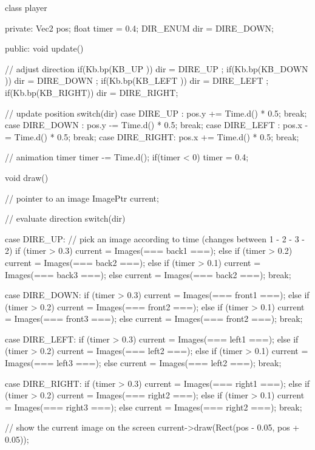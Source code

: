 \begin{code}
class player
{
private: 
   Vec2 pos;
   float timer = 0.4; 
   DIR_ENUM dir = DIRE_DOWN;
   
public:    
   void update()
   {
      // adjust direction
      if(Kb.bp(KB_UP   )) dir = DIRE_UP   ;
      if(Kb.bp(KB_DOWN )) dir = DIRE_DOWN ;
      if(Kb.bp(KB_LEFT )) dir = DIRE_LEFT ;
      if(Kb.bp(KB_RIGHT)) dir = DIRE_RIGHT;
      
      // update position
      switch(dir)
      {
         case DIRE_UP   : pos.y += Time.d() * 0.5; break;
         case DIRE_DOWN : pos.y -= Time.d() * 0.5; break;
         case DIRE_LEFT : pos.x -= Time.d() * 0.5; break;
         case DIRE_RIGHT: pos.x += Time.d() * 0.5; break;
      }
      
      // animation timer
      timer -= Time.d();
      if(timer < 0) timer = 0.4;
   }
   
   void draw()
   {
      // pointer to an image
      ImagePtr current;
      
      // evaluate direction
      switch(dir)
      {
         case DIRE_UP:
         {
            // pick an image according to time (changes between 1 - 2 - 3 - 2)
            if      (timer > 0.3) current = Images(=== back1 ===);
            else if (timer > 0.2) current = Images(=== back2 ===);
            else if (timer > 0.1) current = Images(=== back3 ===);
            else                  current = Images(=== back2 ===);
            break;
         }
         
         case DIRE_DOWN:
         {
            if      (timer > 0.3) current = Images(=== front1 ===);
            else if (timer > 0.2) current = Images(=== front2 ===);
            else if (timer > 0.1) current = Images(=== front3 ===);
            else                  current = Images(=== front2 ===);
            break;
         }
         
         case DIRE_LEFT:
         {
            if      (timer > 0.3) current = Images(=== left1 ===);
            else if (timer > 0.2) current = Images(=== left2 ===);
            else if (timer > 0.1) current = Images(=== left3 ===);
            else                  current = Images(=== left2 ===);
            break;
         }
         
         case DIRE_RIGHT:
         {
            if      (timer > 0.3) current = Images(=== right1 ===);
            else if (timer > 0.2) current = Images(=== right2 ===);
            else if (timer > 0.1) current = Images(=== right3 ===);
            else                  current = Images(=== right2 ===);
            break;
         }
      }
      
      // show the current image on the screen
      current->draw(Rect(pos - 0.05, pos + 0.05));
   }   
}
\end{code}

